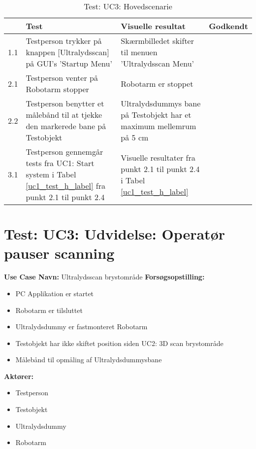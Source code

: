 \begin{table}[htb]
\begin{tabularx}{\textwidth}{|p{0.5cm}|X|X|p{2cm}|}
\hline
\textbf{} & \textbf{Test} & \textbf{Visuelle resultat} &\textbf{Godkendt} \\\hline
1.1 & Testperson trykker på knappen [Ultralydsscan] på GUI's 'Startup Menu' & Skærmbilledet skifter til menuen 'Ultralydsscan Menu' & \\\hline
2.1 & Testperson venter på Robotarm stopper & Robotarm er stoppet & \\\hline
2.2 &  Testperson benytter et målebånd til at tjekke den markerede bane på Testobjekt & Ultralydsdummys bane på Testobjekt har et maximum mellemrum på 5 cm & \\\hline
3.1 & Testperson gennemgår tests fra UC1: Start system i Tabel \ref{uc1_test_h_label} fra punkt 2.1 til punkt 2.4  & Visuelle resultater fra punkt 2.1 til punkt 2.4 i Tabel \ref{uc1_test_h_label} & \\ \hline
\end{tabularx}
    \caption{Test: UC3: Hovedscenarie} 
    \label{uc3_test_h_label}  
\end{table}
\newpage



\section{Test: UC3: Udvidelse: Operatør pauser scanning}
\textbf{Use Case Navn:} Ultralydsscan brystområde \newline
\textbf{Forsøgsopstilling:}
\begin{itemize}
\item PC Applikation er startet
\item Robotarm er tilsluttet
\item Ultralydsdummy er fastmonteret Robotarm
\item Testobjekt har ikke skiftet position siden UC2: 3D scan brystområde
\item Målebånd til opmåling af Ultralydsdummysbane 
\end{itemize}  
\textbf{Aktører:}
\begin{itemize}
\item Testperson
\item Testobjekt
\item Ultralydsdummy
\item Robotarm
\end{itemize}  

